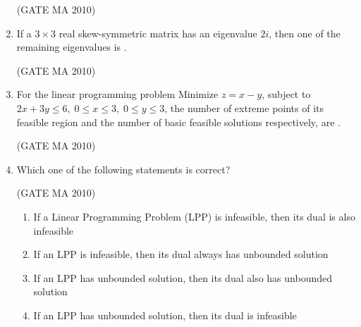 \documentclass[journal,12pt,onecolumn]{IEEEtran}
\theoremstyle{remark}
\begin{document}
\begin{flushleft}
\begin{enumerate}
\hfill(GATE MA 2010)

\begin{enumerate}
\end{enumerate}

\item If a $3\times 3$ real skew-symmetric matrix has an eigenvalue $2i$, then one of the remaining eigenvalues is \underline{\hspace{2cm}}.

\hfill(GATE MA 2010)

\begin{enumerate}
\end{enumerate}
\item For the linear programming problem  
Minimize $z = x-y$, subject to $2x+3y\leq 6, \; 0\leq x \leq 3,\; 0\leq y \leq 3$,  
the number of extreme points of its feasible region and the number of basic feasible solutions respectively, are \underline{\hspace{2cm}}.  

\hfill(GATE MA 2010)

\begin{enumerate}
\end{enumerate}

\item Which one of the following statements is correct? \underline{\hspace{2cm}}  

\hfill(GATE MA 2010)

\begin{enumerate}
\item If a Linear Programming Problem (LPP) is infeasible, then its dual is also infeasible  
\item If an LPP is infeasible, then its dual always has unbounded solution  
\item If an LPP has unbounded solution, then its dual also has unbounded solution  
\item If an LPP has unbounded solution, then its dual is infeasible  
\end{enumerate}


\end{enumerate}
\end{flushleft}
\end{document}
